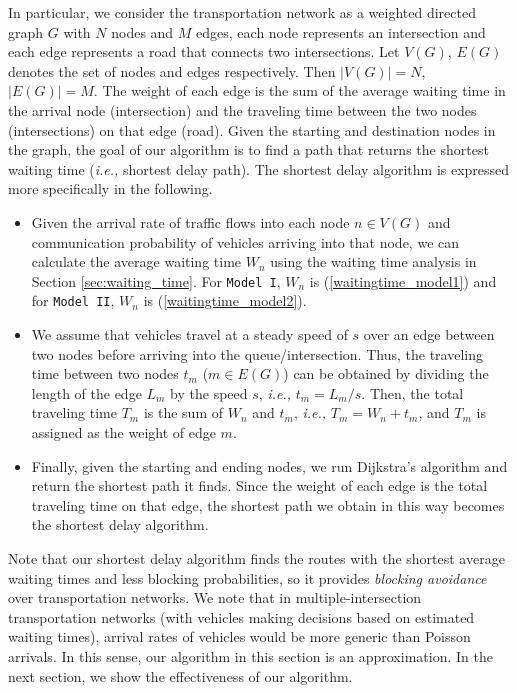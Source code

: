 \documentclass[conference]{IEEEtran}
\newcommand{\ie}{{\em i.e., }}
\newcommand{\modelI}{{\tt{Model I}}}
\newcommand{\modelII}{{\tt{Model II}}}
\begin{document}
In particular, we consider the transportation network as a weighted directed graph $G$ with $N$ nodes and $M$ edges, each node represents an intersection and each edge represents a road that connects two intersections. Let $V(G)$, $E(G)$ denotes the set of nodes and edges respectively. Then $|V(G)|=N$, $|E(G)|=M$. The weight of each edge is the sum of the average waiting time in the arrival node (intersection) and the traveling time between the two nodes (intersections) on that edge (road). Given the starting and destination nodes in the graph, the goal of our algorithm is to find a path that returns the shortest waiting time (\ie shortest delay path). The shortest delay algorithm is expressed more specifically in the following.
\begin{itemize}
\item Given the arrival rate of traffic flows into each node $n\in V(G)$ and communication probability of vehicles arriving into that node, we can calculate the average waiting time $W_n$ using the waiting time analysis in Section \ref{sec:waiting_time}. For \modelI, $W_n$ is (\ref{waitingtime_model1}) and for \modelII, $W_n$ is (\ref{waitingtime_model2}).

\item We assume that vehicles travel at a steady speed of $s$ over an edge between two nodes before arriving into the queue/intersection. Thus, the traveling time between two nodes $t_m$ ($m \in E(G)$) can be obtained by dividing the length of the edge $L_m$ by the speed $s$, \ie $t_m=L_m/s$. Then, the total traveling time $T_m$ is the sum of $W_n$ and $t_m$, \ie $T_m=W_n+t_m$, and $T_m$ is assigned as the weight of edge $m$.

\item Finally, given the starting and ending nodes, we run Dijkstra's algorithm and return the shortest path it finds. Since the weight of each edge is the total traveling time on that edge, the shortest path we obtain in this way becomes the shortest delay algorithm.
\end{itemize}

Note that our shortest delay algorithm finds the routes with the shortest average waiting times and less blocking probabilities, so it provides {\em blocking avoidance} over transportation networks. We note that in multiple-intersection transportation networks (with vehicles making decisions based on estimated waiting times), arrival rates of vehicles would be more generic than Poisson arrivals. In this sense, our algorithm in this section is an approximation. In the next section, we show the effectiveness of our algorithm.
\end{document}
